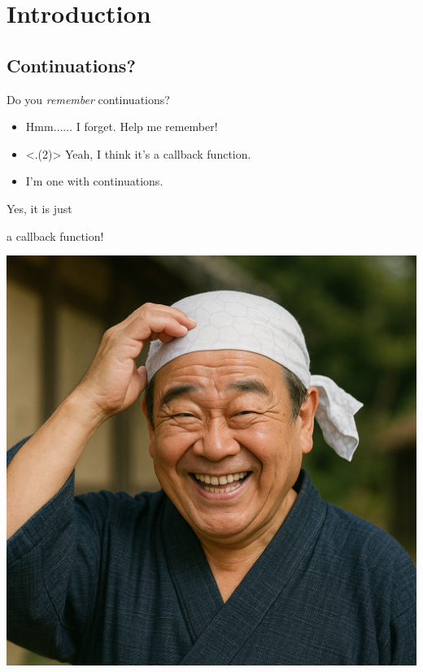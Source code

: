 \section{Introduction}

\subsection{Continuations?}
\begin{frame}[t]
	\frametitlesubs

	Do you \textit{remember} continuations?

	\pause
	\begin{itemize}[<+->]
		\item[\emoji{man-raising-hand}] Hmm$\dots\dots$ I forget. Help me remember!
		\item[\emoji{man-raising-hand}] {\semibf} Yeah, I think it's a callback function.
		\item[\emoji{old-man}] I'm one with continuations.
	\end{itemize}

	\onslide<+->
	\center
	\Large

	\begin{minipage}[c]{.55\linewidth}
		Yes, it is just

		a \textcolor{subhighlight}{callback function}!
	\end{minipage}
	\begin{minipage}[c]{.38\linewidth}
		\includegraphics[height=.5\textheight]{img/ukkari.png}
	\end{minipage}

\end{frame}

